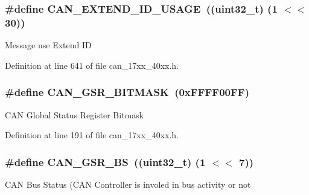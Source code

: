\subsubsection[{\texorpdfstring{C\+A\+N\+\_\+\+E\+X\+T\+E\+N\+D\+\_\+\+I\+D\+\_\+\+U\+S\+A\+GE}{CAN_EXTEND_ID_USAGE}}]{\setlength{\rightskip}{0pt plus 5cm}\#define C\+A\+N\+\_\+\+E\+X\+T\+E\+N\+D\+\_\+\+I\+D\+\_\+\+U\+S\+A\+GE~((uint32\+\_\+t) (1 $<$$<$ 30))}\hypertarget{group__CAN__17XX__40XX_ga51d10a0931e925cff94c86d2e2237ddc}{}\label{group__CAN__17XX__40XX_ga51d10a0931e925cff94c86d2e2237ddc}
Message use Extend ID 

Definition at line 641 of file can\+\_\+17xx\+\_\+40xx.\+h.

\subsubsection[{\texorpdfstring{C\+A\+N\+\_\+\+G\+S\+R\+\_\+\+B\+I\+T\+M\+A\+SK}{CAN_GSR_BITMASK}}]{\setlength{\rightskip}{0pt plus 5cm}\#define C\+A\+N\+\_\+\+G\+S\+R\+\_\+\+B\+I\+T\+M\+A\+SK~(0x\+F\+F\+F\+F00\+F\+F)}\hypertarget{group__CAN__17XX__40XX_ga35466902944ebf9952a1c4fc53a96561}{}\label{group__CAN__17XX__40XX_ga35466902944ebf9952a1c4fc53a96561}
C\+AN Global Status Register Bitmask 

Definition at line 191 of file can\+\_\+17xx\+\_\+40xx.\+h.

\subsubsection[{\texorpdfstring{C\+A\+N\+\_\+\+G\+S\+R\+\_\+\+BS}{CAN_GSR_BS}}]{\setlength{\rightskip}{0pt plus 5cm}\#define C\+A\+N\+\_\+\+G\+S\+R\+\_\+\+BS~((uint32\+\_\+t) (1 $<$$<$ 7))}\hypertarget{group__CAN__17XX__40XX_gaa304ce39b130166e51304ded48d0c969}{}\label{group__CAN__17XX__40XX_gaa304ce39b130166e51304ded48d0c969}
C\+AN Bus Status (C\+AN Controller is involed in bus activity or not 

